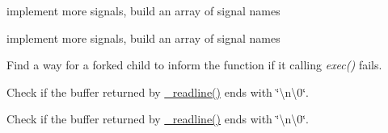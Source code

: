 
\begin{DoxyRefList}
\item[\label{todo__todo000002}%
\hypertarget{todo__todo000002}{}%
Member \hyperlink{job_8h_a723e6648fca47a139cdff5cf4f1bc4bb}{Ash\-\_\-kill} (Process $\ast$p, int in\-\_\-file, int out\-\_\-file, int err\-\_\-file)]implement more signals, build an array of signal names 
\item[\label{todo__todo000003}%
\hypertarget{todo__todo000003}{}%
Member \hyperlink{job_8h_a07e5c62e1d5e55012cf188dd32b6cf27}{Ash\-\_\-killall} (Process $\ast$p, int in\-\_\-file, int out\-\_\-file, int err\-\_\-file)]implement more signals, build an array of signal names 
\item[\label{todo__todo000001}%
\hypertarget{todo__todo000001}{}%
Member \hyperlink{job_8h_a328634c49391a29ef1d4e86d6bf0ea7e}{execute\-\_\-job} (Job $\ast$j)]Find a way for a forked child to inform the function if it calling {\itshape exec()} fails. 
\item[\label{todo__todo000004}%
\hypertarget{todo__todo000004}{}%
Member \hyperlink{main_8c_ae8d7cb95bc48828d10bf3c7a31680ce2}{pipeline\-\_\-list} ]Check if the buffer returned by \hyperlink{cle_8c_a19bb8493640e845196c4d763f4109b67}{\-\_\-readline()} ends with \char`\"{}\textbackslash{}n\textbackslash{}0\char`\"{}. 
\item[\label{todo__todo000005}%
\hypertarget{todo__todo000005}{}%
Member \hyperlink{main_8c_a5b769ff51538c10c1c6095245f1eb9db}{pipeline\-\_\-list\-\_\-} ]Check if the buffer returned by \hyperlink{cle_8c_a19bb8493640e845196c4d763f4109b67}{\-\_\-readline()} ends with \char`\"{}\textbackslash{}n\textbackslash{}0\char`\"{}.
\end{DoxyRefList}